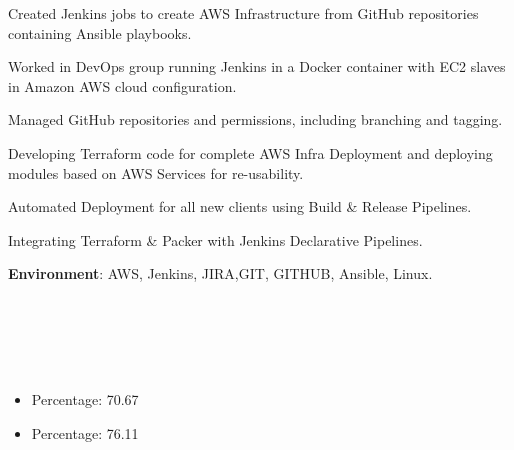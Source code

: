 \documentclass[10pt,a4paper,ragged2e,withhyper]{altacv}
\begin{document}
{\begin{paracol}{2}
\divider
\begin{itemize}
\large{
    \item Created Jenkins jobs to create AWS Infrastructure from GitHub repositories containing Ansible playbooks. 
    \item Worked in DevOps group running Jenkins in a Docker container with EC2 slaves in Amazon AWS cloud configuration.
    \item Managed GitHub repositories and permissions, including branching and tagging.
    \item Developing Terraform code for complete AWS Infra Deployment and deploying modules based on AWS Services for re-usability.
    \item Automated Deployment for all new clients using Build \& Release Pipelines.
    \item Integrating Terraform \& Packer with Jenkins Declarative Pipelines.
}
\end{itemize}
\textbf{\large{Environment}}: AWS, Jenkins, JIRA,GIT, GITHUB, Ansible, Linux.

\switchcolumn
\newpage


\large{
\\
\\
\\
\\
}
        \begin{itemize}
            \item Percentage: 70.67 
        \end{itemize}
        \divider
    
        \begin{itemize}
            \item Percentage: 76.11
        \end{itemize}
        

\end{paracol}}
\end{document}
